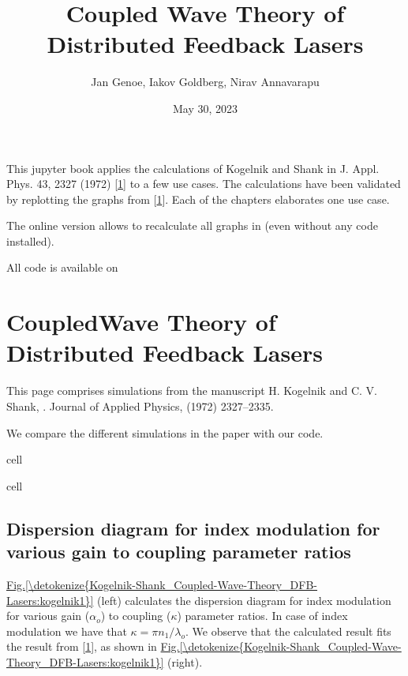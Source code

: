 \documentclass[a4paper,10pt,english,openany,oneside]{jupyterBook}
\title{Coupled Wave Theory of Distributed Feedback Lasers}
\date{May 30, 2023}
\author{Jan Genoe, Iakov Goldberg, Nirav Annavarapu}
\begin{document}
\pagestyle{empty}
\sphinxmaketitle
\pagestyle{plain}
\sphinxtableofcontents
\pagestyle{normal}
\label{\detokenize{intro::doc}}


\sphinxAtStartPar
This jupyter book applies the calculations of Kogelnik and Shank in J. Appl. Phys. 43, 2327 (1972) {[}\hyperlink{cite.bib:id3}{1}{]} to a few use cases.
The calculations have been validated by replotting the graphs from {[}\hyperlink{cite.bib:id3}{1}{]}.
Each of the chapters elaborates one use case.

\sphinxAtStartPar
The online version allows to recalculate all graphs in  (even without any code installed).

\sphinxAtStartPar
All code is available on 

\sphinxstepscope


\chapter{Coupled\sphinxhyphen{}Wave Theory of Distributed Feedback Lasers}
\label{\detokenize{Kogelnik-Shank_Coupled-Wave-Theory_DFB-Lasers:coupled-wave-theory-of-distributed-feedback-lasers}}\label{\detokenize{Kogelnik-Shank_Coupled-Wave-Theory_DFB-Lasers::doc}}
\sphinxAtStartPar
This page comprises simulations from the manuscript H. Kogelnik and C. V. Shank, . Journal of Applied Physics,  (1972) 2327–2335. 

\sphinxAtStartPar
We compare the different simulations in the paper with our code.

\begin{sphinxuseclass}{cell}
\end{sphinxuseclass}
\begin{sphinxuseclass}{cell}
\end{sphinxuseclass}

\section{Dispersion diagram for index modulation for various gain to coupling parameter ratios}
\label{\detokenize{Kogelnik-Shank_Coupled-Wave-Theory_DFB-Lasers:dispersion-diagram-for-index-modulation-for-various-gain-to-coupling-parameter-ratios}}
\sphinxAtStartPar
\hyperref[\detokenize{Kogelnik-Shank_Coupled-Wave-Theory_DFB-Lasers:kogelnik1}]{Fig.\@ \ref{\detokenize{Kogelnik-Shank_Coupled-Wave-Theory_DFB-Lasers:kogelnik1}}} (left) calculates the dispersion diagram for index modulation for various gain (\(\alpha_o\)) to coupling (\(\kappa\)) parameter ratios. In case of index modulation we have that \(\kappa= \pi n_1/\lambda_o\). We observe that the calculated result fits the result from {[}\hyperlink{cite.bib:id3}{1}{]}, as shown in \hyperref[\detokenize{Kogelnik-Shank_Coupled-Wave-Theory_DFB-Lasers:kogelnik1}]{Fig.\@ \ref{\detokenize{Kogelnik-Shank_Coupled-Wave-Theory_DFB-Lasers:kogelnik1}}} (right).
\end{document}
